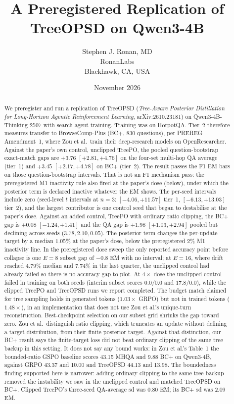 \documentclass[11pt]{article}
\title{A Preregistered Replication of TreeOPSD on Qwen3-4B}
\author{Stephen J. Ronan, MD\\RonanLabs\\Blackhawk, CA, USA}
\date{November 2026}
\begin{document}
\maketitle

\begin{abstract}
We preregister and run a replication of TreeOPSD (\textit{Tree-Aware
Posterior Distillation for Long-Horizon Agentic Reinforcement Learning},
arXiv:2610.23181) on Qwen3-4B-Thinking-2507 with search-agent training.
Training was on HotpotQA. Tier~2 therefore measures transfer to
BrowseComp-Plus (BC+, 830 questions), per PREREG Amendment~1, where
Zou et al.\ train their deep-research models on OpenResearcher.
Against the paper's own control, unclipped TreePO, the pooled
question-bootstrap exact-match gaps are $+3.76$ $[+2.81, +4.76]$ on the
four-set multi-hop QA average (tier~1) and $+3.45$ $[+2.17, +4.78]$ on
BC+ (tier~2). The result passes the F1 EM bars on those
question-bootstrap intervals. That is not an F1 mechanism pass: the
preregistered M1 inactivity rule also fired at the paper's dose (below),
under which the posterior term is declared inactive whatever the EM
shows. The per-seed intervals include zero (seed-level $t$ intervals at
$n=3$: $[-4.06, +11.57]$ tier~1, $[-6.13, +13.03]$ tier~2), and the
largest contributor is one control seed that began to destabilise at the
paper's dose. Against an added control, TreePO with ordinary ratio clipping, the
BC+ gap is $+0.08$ $[-1.24, +1.41]$ and the QA gap is $+1.98$
$[+1.03, +2.94]$ pooled but declining across seeds ($3.78, 2.10, 0.05$).
The posterior term changes the per-update target by a median $1.05\%$ at
the paper's dose, below the preregistered $2\%$ M1 inactivity line. In
the preregistered dose sweep the only reported accuracy point before
collapse is one $E{=}8$ subset gap of $-0.8$ EM with no interval; at
$E{=}16$, where drift reached $4.79\%$ median and $7.74\%$ in the last
quarter, the unclipped control had already failed so there is no
accuracy gap to plot. At $4\times$ dose the
unclipped control failed in training on both seeds (interim subset scores
$0.0/0.0$ and $17.8/0.0$), while the clipped TreePO and TreeOPSD runs we
report completed. The budget match claimed for tree sampling holds in
generated tokens ($1.03\times$ GRPO) but not in trained tokens
($1.48\times$), in an implementation that does not use Zou et al.'s
unique-turn reconstruction. Best-checkpoint selection on our subset grid
shrinks the gap toward zero. Zou et al.\ distinguish ratio clipping,
which truncates an update without defining a target distribution, from
their finite posterior target. Against that distinction, our BC+ result
says the finite-target loss did not beat ordinary clipping of the same
tree backup in this setting. It does not say any bound works: in Zou
et al.'s Table~1 the bounded-ratio GSPO baseline scores 43.15 MHQA and
9.88 BC+ on Qwen3-4B, against GRPO 43.37 and 10.00 and TreeOPSD 44.13
and 13.98. The boundedness finding supported here is narrower: adding
ordinary clipping to the same tree backup removed the instability we saw
in the unclipped control and matched TreeOPSD on BC+. Clipped TreePO's
three-seed QA-average sd was $0.80$ EM; its BC+ sd was $2.09$ EM.
\end{abstract}
\end{document}

